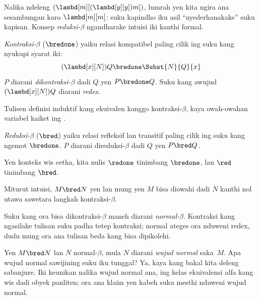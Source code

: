 \documentclass[../../../include/open-logic-section]{subfiles}
\begin{document}

Nalika ndeleng
$(\lambd[m][(\lambd[y][y]) m])$,
lumrah yen kita ngira ana
sesambungan karo $\lambd[m][m]$:
suku kapindho iku asil
``nyederhanakake'' suku kapisan.
Konsep \emph{reduksi-$\beta$}
ngandharake intuisi iki kanthi formal.

\begin{defn} 
  \emph{Kontraksi-$\beta$} ($\bredone$)
  yaiku relasi kompatibel paling cilik
  ing suku kang nyukupi syarat iki:
  \[
    (\lambd[x][N])Q \bredone \Subst{N}{Q}{x} 
  \]
  $P$ diarani \emph{dikontraksi-$\beta$}
  dadi $Q$ yen $P \bredone Q$.
  Suku kang awujud
  $(\lambd[x][N])Q$ diarani
  \emph{redex}.
\end{defn}

\begin{prob} 
  Tulisen definisi induktif
  kang ekuivalen kanggo
  kontraksi-$\beta$, kaya
  owah-owahan variabel kaiket
  ing .
\end{prob}
  
\begin{defn} 
  \emph{Reduksi-$\beta$} ($\bred$)
  yaiku relasi refleksif lan transitif
  paling cilik ing suku kang
  ngemot $\bredone$.
  $P$ diarani direduksi-$\beta$
  dadi $Q$ yen $P \bred Q$.
\end{defn}

Yen konteks wis cetha,
kita nulis $\redone$ tinimbang
$\bredone$, lan $\red$
tinimbang $\bred$.

Miturut intuisi, $M \bred N$
yen lan mung yen $M$ bisa
diowahi dadi $N$ kanthi nol
utawa sawetara langkah
kontraksi-$\beta$.

\begin{defn}
Suku kang ora bisa dikontraksi-$\beta$
maneh diarani \emph{normal-$\beta$}. Kontraksi kang ngasilake tulisan suku padha tetep kontraksi; normal ateges ora nduweni redex, dudu mung ora ana tulisan beda kang bisa dipikolehi.
\end{defn}

Yen $M \bred N$ lan $N$
normal-$\beta$, mula $N$
diarani \emph{wujud normal}
saka~$M$. Apa wujud normal
sawijining suku iku tunggal?
Ya, kaya kang bakal kita
deleng sabanjure. Iki keunikan nalika wujud normal ana, ing kelas ekuivalensi alfa kang wis dadi obyek panliten; ora ana klaim yen kabeh suku mesthi nduweni wujud normal.
\end{document}
